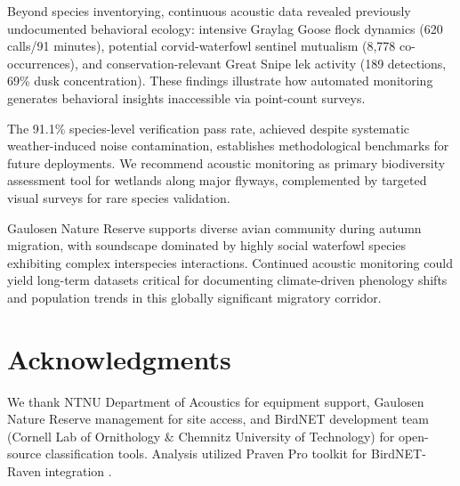 \documentclass[twocolumn]{article}
\begin{document}
Beyond species inventorying, continuous acoustic data revealed previously undocumented behavioral ecology: intensive Graylag Goose flock dynamics (620 calls/91 minutes), potential corvid-waterfowl sentinel mutualism (8,778 co-occurrences), and conservation-relevant Great Snipe lek activity (189 detections, 69\% dusk concentration). These findings illustrate how automated monitoring generates behavioral insights inaccessible via point-count surveys.

The 91.1\% species-level verification pass rate, achieved despite systematic weather-induced noise contamination, establishes methodological benchmarks for future deployments. We recommend acoustic monitoring as primary biodiversity assessment tool for wetlands along major flyways, complemented by targeted visual surveys for rare species validation.

Gaulosen Nature Reserve supports diverse avian community during autumn migration, with soundscape dominated by highly social waterfowl species exhibiting complex interspecies interactions. Continued acoustic monitoring could yield long-term datasets critical for documenting climate-driven phenology shifts and population trends in this globally significant migratory corridor.

\section*{Acknowledgments}

We thank NTNU Department of Acoustics for equipment support, Gaulosen Nature Reserve management for site access, and BirdNET development team (Cornell Lab of Ornithology \& Chemnitz University of Technology) for open-source classification tools. Analysis utilized Praven Pro toolkit for BirdNET-Raven integration \citep{Redpath2025}.
\end{document}

